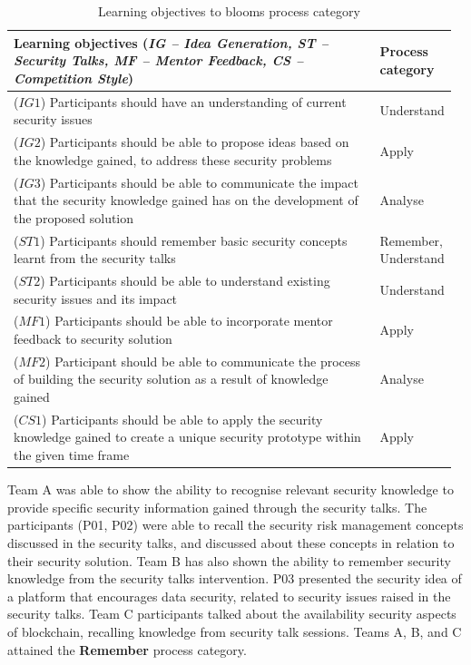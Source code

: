 \documentclass[runningheads]{llncs}
\begin{document}
 \begin{table}[h]
    \centering
    \caption{Learning objectives to blooms process category}
    \label{tab:learningoutcomesbloom}
    \begin{tabular}{|p{0.83\linewidth}|p{0.14\linewidth}|} \hline
    Learning objectives (\textit{IG -- Idea Generation, ST -- Security Talks, MF -- Mentor Feedback, CS -- Competition Style}) & Process \newline category\\ \hline
    ($IG1$) Participants should have an understanding of current security issues & Understand \\ \hline
    ($IG2$) Participants should be able to propose ideas based on the knowledge gained, to address these security problems & Apply\\ \hline
    ($IG3$) Participants should be able to communicate the impact that the security knowledge gained has on the development of the proposed solution & Analyse \\ \hline
    ($ST1$) Participants should remember basic security concepts learnt from the security talks & Remember, \newline Understand \\ \hline
    ($ST2$) Participants should be able to understand existing security issues and its impact & Understand \\ \hline
    ($MF1$) Participants should be able to incorporate mentor feedback to security solution & Apply \\ \hline
    ($MF2$) Participant should be able to communicate the process of building the security solution as a result of knowledge gained & Analyse \\ \hline
    ($CS1$) Participants should be able to apply the security knowledge gained to create a unique security prototype within the given time frame & Apply \\ \hline
    \end{tabular}
    \vspace{-10pt}
\end{table}

Team A was able to show the ability to recognise relevant security knowledge to provide specific security information gained through the security talks. The participants (P01, P02) were able to recall the security risk management concepts discussed in the security talks, and discussed about these concepts in relation to their security solution. 
Team B has also shown the ability to remember security knowledge from the security talks intervention. P03 presented the security idea of a platform that encourages data security, related to security issues raised in the security talks. Team C participants talked about the availability security aspects of blockchain, recalling knowledge from security talk sessions. Teams A, B, and C attained the \textbf{Remember} process category.
\end{document}
